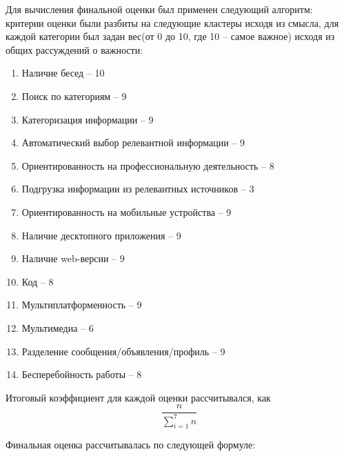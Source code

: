 Для вычисления финальной оценки был применен следующий алгоритм: 
критерии оценки были разбиты на следующие кластеры исходя из смысла, для каждой категории был задан вес(от 0 до 10, где 10 -- самое важное) исходя из общих рассуждений о важности: 
\begin{enumerate}
	
	\item Наличие бесед -- 10
	\item Поиск по категориям -- 9
	\item Категоризация информации -- 9
	\item Автоматический выбор релевантной информации -- 9
	\item Ориентированность на профессиональную деятельность -- 8
	\item Подгрузка информации из релевантных источников -- 3
	\item Ориентированность на мобильные устройства -- 9
	\item Наличие десктопного приложения -- 9
	\item Наличие web-версии -- 9
	\item Код -- 8
	\item Мультиплатформенность -- 9
	\item Мультимедиа -- 6
	\item Разделение сообщения/объявления/профиль -- 9
	\item Бесперебойность работы -- 8
\end{enumerate}
Итоговый коэффициент для каждой оценки рассчитывался, как 
\begin{equation}
\frac{n}{\sum_{i = 1}^7 n} \label{eq}
\end{equation} 

Финальная оценка рассчитывалась по следующей формуле:\\





\renewcommand{\labelenumi}{\arabic{enumi}.}

\renewcommand{\labelenumii}{\arabic{enumii}.}

\renewcommand{\labelenumiii}{\arabic{enumiii}.}
